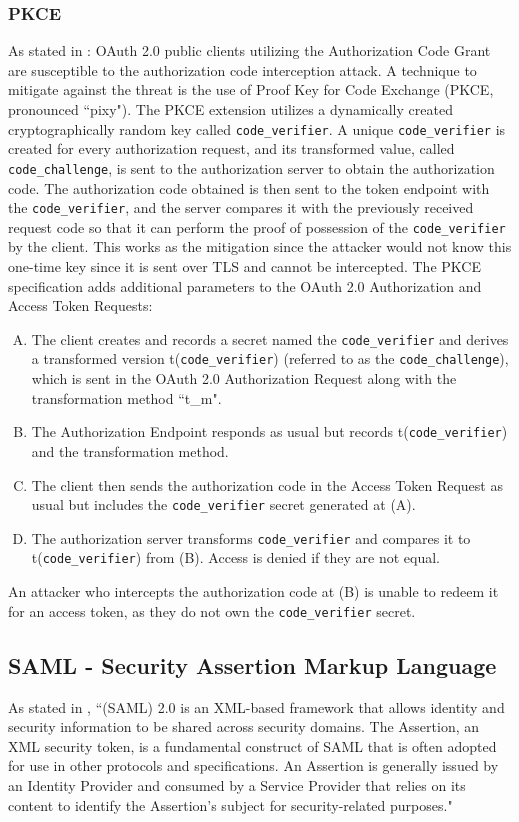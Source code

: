 \subsubsection{PKCE}
As stated in \cite{pkce_downgrade}: OAuth 2.0 public clients utilizing the Authorization Code Grant are susceptible to the authorization code interception attack. A technique to mitigate against the threat is the use of Proof Key for Code Exchange (PKCE, pronounced ``pixy"). The PKCE extension utilizes a dynamically created cryptographically random key called \texttt{code\_verifier}. A unique \texttt{code\_verifier} is created for every authorization request, and its transformed value, called \texttt{code\_challenge}, is sent to the authorization server to obtain the authorization code. The authorization code obtained is then sent to the token endpoint with the \texttt{code\_verifier}, and the server compares it with the previously received request code so that it can perform the proof of possession of the \texttt{code\_verifier} by the client. This works as the mitigation since the attacker would not know this one-time key since it is sent over TLS and cannot be intercepted.
The PKCE specification adds additional parameters to the OAuth 2.0 Authorization and Access Token Requests:
\begin{enumerate}[(A)]
    \item The client creates and records a secret named the \texttt{code\_verifier} and derives a transformed version t(\texttt{code\_verifier}) (referred to as the \texttt{code\_challenge}), which is sent in the OAuth 2.0 Authorization Request along with the transformation method ``t\_m". 
    \item The Authorization Endpoint responds as usual but records t(\texttt{code\_verifier}) and the transformation method. 
    \item The client then sends the authorization code in the Access Token Request as usual but includes the \texttt{code\_verifier} secret generated at (A). 
    \item The authorization server transforms \texttt{code\_verifier} and compares it to t(\texttt{code\_verifier}) from (B).  Access is denied if they are not equal.
\end{enumerate}
An attacker who intercepts the authorization code at (B) is unable to redeem it for an access token, as they do not own the \texttt{code\_verifier} secret.

\subsection{SAML - Security Assertion Markup Language}
As stated in \cite{ietf_SAML}, ``(\Gls{SAML}) 2.0 is an XML-based framework that allows identity and security information to be shared across security domains. The Assertion, an XML security token, is a fundamental construct of \Gls{SAML} that is often adopted for use in other protocols and specifications. An Assertion is generally issued by an Identity Provider and consumed by a Service Provider that relies on its content to identify the Assertion's subject for security-related purposes."





